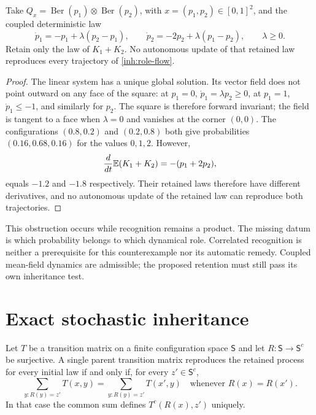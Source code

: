 Take $Q_x=\operatorname{Ber}(p_1)\otimes\operatorname{Ber}(p_2)$, with
$x=(p_1,p_2)\in[0,1]^2$, and the coupled deterministic law
\begin{equation}
 \dot p_1=-p_1+\lambda(p_2-p_1),\qquad
 \dot p_2=-2p_2+\lambda(p_1-p_2),\qquad \lambda\geq0.
 \label{inh:role-flow}
\end{equation}
Retain only the law of $K_1+K_2$. No autonomous update of that retained law
reproduces every trajectory of \cref{inh:role-flow}.

\begin{proof}
The linear system has a unique global solution. Its vector field does not
point outward on any face of the square: at $p_1=0$, $\dot p_1=\lambda p_2\geq0$,
at $p_1=1$, $\dot p_1\leq-1$, and similarly for $p_2$. The square is therefore
forward invariant; the field is tangent to a face when $\lambda=0$ and
vanishes at the corner $(0,0)$. The configurations $(0.8,0.2)$ and
$(0.2,0.8)$ both give probabilities $(0.16,0.68,0.16)$ for the values
$0,1,2$. However,
\begin{equation}
 \frac{d}{dt}\mathbb E(K_1+K_2)=-(p_1+2p_2),
\end{equation}
equals $-1.2$ and $-1.8$ respectively. Their retained laws therefore have
different derivatives, and no autonomous update of the retained law can
reproduce both trajectories.
\end{proof}

This obstruction occurs while recognition remains a product. The missing
datum is which probability belongs to which dynamical role. Correlated
recognition is neither a prerequisite for this counterexample nor its
automatic remedy. Coupled mean-field dynamics are admissible; the proposed
retention must still pass its own inheritance test.

\section{Exact stochastic inheritance}

Let $T$ be a transition matrix on a finite configuration space $\mathsf S$
and let $R:\mathsf S\to\mathsf S^c$ be surjective. A single parent
transition matrix reproduces the retained process for every initial law if
and only if, for every $z'\in\mathsf S^c$,
\begin{equation}
 \sum_{y:R(y)=z'}T(x,y)
 =\sum_{y:R(y)=z'}T(x',y)
 \quad\text{whenever }R(x)=R(x').
 \label{inh:lumpability}
\end{equation}
In that case the common sum defines $T^c(R(x),z')$ uniquely.

